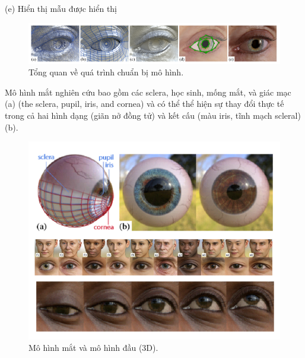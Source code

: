 (e) Hiển thị mẫu được hiển thị 
\begin{center}
    \begin{figure}[h!]
    \begin{center}
     \includegraphics[scale=0.75]{img/An_overview_of_our_model_preparation_process.png}
    \end{center}
    \caption{Tổng quan về quá trình chuẩn bị mô hình.}
    \label{refhinh20}
    \end{figure}
\end{center}
Mô hình mắt nghiên cứu bao gồm các sclera, học sinh, mống mắt, và giác mạc (a) (the sclera, pupil, iris, and cornea) và có thể thể hiện sự thay đổi thực tế trong cả hai hình dạng (giãn nở đồng tử) và kết cấu (màu iris, tĩnh mạch scleral) (b).
\begin{center}
    \begin{figure}[h!]
    \begin{center}
     \includegraphics[scale=0.75]{img/Eye_model_and_3D_head_model.png}
    \end{center}
    \caption{Mô hình mắt và mô hình đầu (3D).}
    \label{refhinh20}
    \end{figure}
\end{center}

